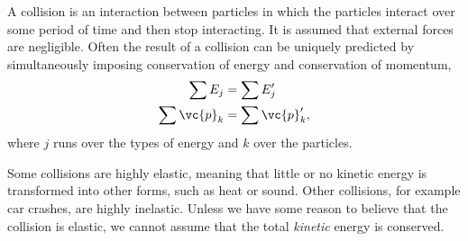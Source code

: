 A collision is an interaction between particles in which the particles interact
over some period of time and then stop interacting. It is assumed that external
forces are negligible. Often the result of a collision can be uniquely predicted
by simultaneously imposing conservation of energy and conservation of momentum,
\begin{align}
  \sum E_j &= \sum E_j' \\
  \sum \vc{p}_k &= \sum \vc{p}_k' ,
\end{align}
where $j$ runs over the types of energy and $k$ over the particles.

Some collisions are highly elastic, meaning that little or no kinetic energy is
transformed into other forms, such as heat or sound. Other collisions, for example
car crashes, are highly inelastic. Unless we have some reason to believe that
the collision is elastic, we cannot assume that the total \emph{kinetic} energy
is conserved.
